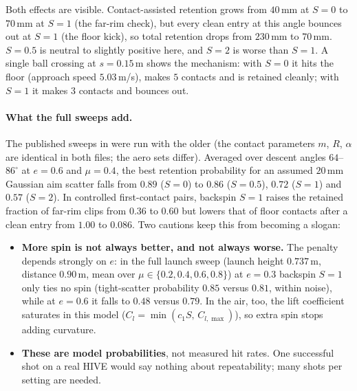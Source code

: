 Both effects are visible. Contact-assisted retention grows from $40$\,\unit{mm}\predicted{} at
$S=0$ to $70$\,\unit{mm}\predicted{} at $S=1$ (the far-rim check), but every clean entry at this
angle bounces out at $S=1$ (the floor kick), so total retention drops from
$230$\,\unit{mm}\predicted{} to $70$\,\unit{mm}\predicted. $S=0.5$ is neutral to slightly
positive here, and $S=2$ is worse than $S=1$. A single ball crossing at $s=0.15$\,\unit{m}\assumed{}
shows the mechanism: with $S=0$ it hits the floor (approach speed
$5.03$\,\unit{m/s}\predicted), makes $5$\predicted{} contacts and is retained cleanly; with
$S=1$ it makes $3$\predicted{} contacts and bounces out.

\paragraph{What the full sweeps add.}
The published sweeps in  were run with the older
 (the contact parameters $m$, $R$, $\alpha$ are identical in both
files; the aero sets differ). Averaged over descent angles $64$--$86^\circ$\assumed{} at
$e=0.6$\assumed{} and $\mu=0.4$\assumed, the best retention probability for an assumed $20$\,\unit{mm}\assumed{}
Gaussian aim scatter falls from $0.89$\predicted{} ($S=0$) to $0.86$\predicted{} ($S=0.5$),
$0.72$\predicted{} ($S=1$) and $0.57$\predicted{} ($S=2$). In controlled first-contact pairs,
backspin $S=1$ raises the retained fraction of far-rim clips from $0.36$\predicted{} to
$0.60$\predicted{} but lowers that of floor contacts after a clean entry from
$1.00$\predicted{} to $0.086$\predicted. Two cautions keep this from becoming a slogan:
\begin{itemize}
  \item \textbf{More spin is not always better, and not always worse.} The penalty depends
  strongly on $e$: in the full launch sweep (launch height $0.737$\,\unit{m}\assumed, distance $0.90$\,\unit{m}\assumed, mean over $\mu\in\{0.2,0.4,0.6,0.8\}$\assumed) at $e=0.3$\assumed{} backspin $S=1$ only ties no
  spin (tight-scatter probability $0.85$\predicted{} versus $0.81$\predicted, within noise),
  while at $e=0.6$\assumed{} it falls to $0.48$\predicted{} versus $0.79$\predicted. In the
  air, too, the lift coefficient saturates in this model ($C_l=\min(c_1S,\,C_{l,\max})$), so
  extra spin stops adding curvature.
  \item \textbf{These are model probabilities}, not measured hit rates. One successful shot on a
  real HIVE would say nothing about repeatability; many shots per setting are needed.
\end{itemize}

